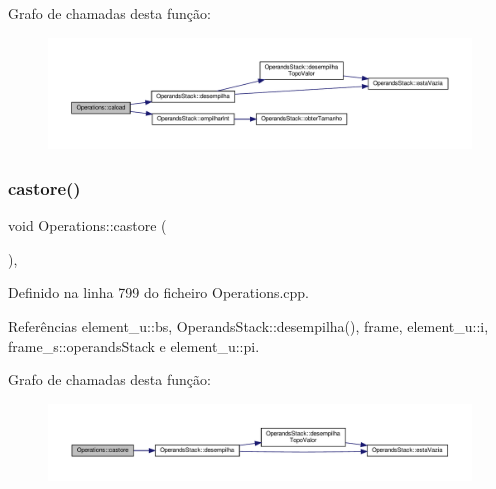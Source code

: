 Grafo de chamadas desta função\+:\nopagebreak
\begin{figure}[H]
\begin{center}
\leavevmode
\includegraphics[width=350pt]{classOperations_a4bb55ffc2ba79a76a019a0c02d29d7f9_cgraph}
\end{center}
\end{figure}
\mbox{\label{classOperations_a417c4833f2f048350920358961cfab03}} 
\subsubsection{\texorpdfstring{castore()}{castore()}}
{\footnotesize\ttfamily void Operations\+::castore (\begin{DoxyParamCaption}{ }\end{DoxyParamCaption})\hspace{0.3cm}{\ttfamily [static]}, {\ttfamily [private]}}



Definido na linha 799 do ficheiro Operations.\+cpp.



Referências element\+\_\+u\+::bs, Operands\+Stack\+::desempilha(), frame, element\+\_\+u\+::i, frame\+\_\+s\+::operands\+Stack e element\+\_\+u\+::pi.

Grafo de chamadas desta função\+:\nopagebreak
\begin{figure}[H]
\begin{center}
\leavevmode
\includegraphics[width=350pt]{classOperations_a417c4833f2f048350920358961cfab03_cgraph}
\end{center}
\end{figure}
\mbox{\label{classOperations_ab5a2d770d297ace1ec0e40d3fed9f0e3}} 
